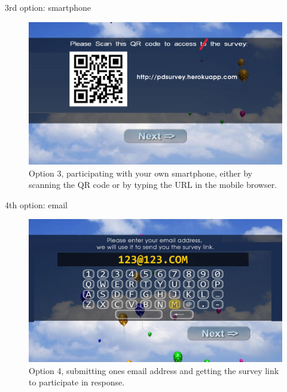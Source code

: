     3rd option: smartphone

    \begin{figure}
        \begin{center}
            \includegraphics[width=\columnwidth]{img/screenshots/option-smartphone.jpg}
        \end{center}
     \caption{Option 3, participating with your own smartphone, either by scanning the QR code or by typing the URL in the mobile browser.}
     \label{screenshot:smartphone-option}
    \end{figure}


    4th option: email

    \begin{figure}
        \begin{center}
            \includegraphics[width=\columnwidth]{img/screenshots/option-email.jpg}
        \end{center}
     \caption{Option 4, submitting ones email address and getting the survey link to participate in response.}
     \label{screenshot:email-option}
    \end{figure}















